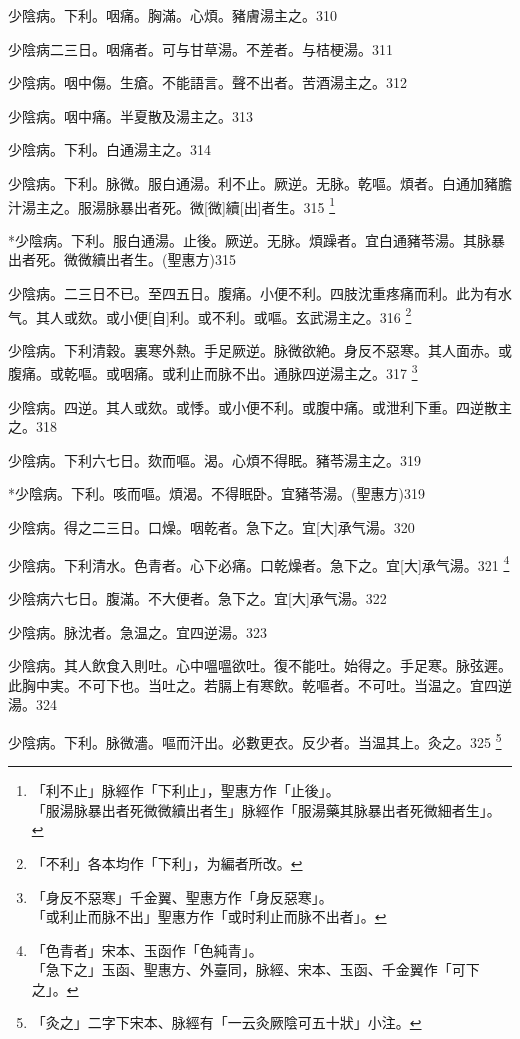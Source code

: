 \documentclass[12pt,twoside,UTF8,b5paper]{ctexbook}
\begin{document}
少陰病。下利。咽痛。胸滿。心煩。豬膚湯主之。310

少陰病二三日。咽痛者。可与甘草湯。不差者。与桔梗湯。311

少陰病。咽中傷。生瘡。不能語言。聲不出者。苦酒湯主之。312

少陰病。咽中痛。半夏散及湯主之。313

少陰病。下利。白通湯主之。314

少陰病。下利。脉微。服白通湯。利不止。厥逆。无脉。乾嘔。煩者。白通加豬膽汁湯主之。服湯脉暴出者死。微[微]續[出]者生。315
	\footnote{「利不止」脉經作「下利止」，聖惠方作「止後」。\\「服湯脉暴出者死微微續出者生」脉經作「服湯藥其脉暴出者死微細者生」。}

*少陰病。下利。服白通湯。止後。厥逆。无脉。煩躁者。宜白通豬苓湯。其脉暴出者死。微微續出者生。(聖惠方)315

少陰病。二三日不已。至四五日。腹痛。小便不利。四肢沈重疼痛而利。此为有水气。其人或欬。或小便[自]利。或不利。或嘔。玄武湯主之。316
	\footnote{「不利」各本均作「下利」，为編者所改。}

少陰病。下利清穀。裏寒外熱。手足厥逆。脉微欲絶。身反不惡寒。其人面赤。或腹痛。或乾嘔。或咽痛。或利止而脉不出。通脉四逆湯主之。317
	\footnote{「身反不惡寒」千金翼、聖惠方作「身反惡寒」。\\「或利止而脉不出」聖惠方作「或时利止而脉不出者」。}

少陰病。四逆。其人或欬。或悸。或小便不利。或腹中痛。或泄利下重。四逆散主之。318

少陰病。下利六七日。欬而嘔。渴。心煩不得眠。豬苓湯主之。319

*少陰病。下利。咳而嘔。煩渴。不得眠卧。宜豬苓湯。(聖惠方)319

少陰病。得之二三日。口燥。咽乾者。急下之。宜[大]承气湯。320

少陰病。下利清水。色青者。心下必痛。口乾燥者。急下之。宜[大]承气湯。321
	\footnote{「色青者」宋本、玉函作「色純青」。\\「急下之」玉函、聖惠方、外臺同，脉經、宋本、玉函、千金翼作「可下之」。}

少陰病六七日。腹滿。不大便者。急下之。宜[大]承气湯。322

少陰病。脉沈者。急温之。宜四逆湯。323

少陰病。其人飲食入則吐。心中嗢嗢欲吐。復不能吐。始得之。手足寒。脉弦遲。此胸中実。不可下也。当吐之。若膈上有寒飲。乾嘔者。不可吐。当温之。宜四逆湯。324

少陰病。下利。脉微濇。嘔而汗出。必數更衣。反少者。当温其上。灸之。325
	\footnote{「灸之」二字下宋本、脉經有「一云灸厥陰可五十狀」小注。}
\end{document}
